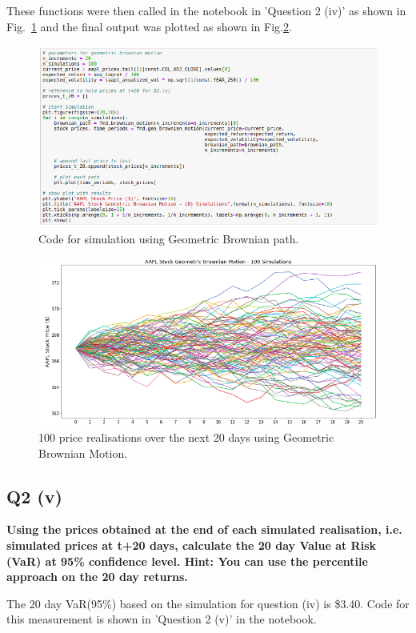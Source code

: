 \noindent
These functions were then called in the notebook in 'Question 2 (iv)' as shown in Fig.~\ref{fig:notebrown} and the final output was plotted as shown in Fig.\ref{fig:notebrownplot}.

\begin{figure}[H]
\centering
  \includegraphics[scale = .60]{imgs/simulation100.png}
  \caption{Code for simulation using Geometric Brownian path.}
  \label{fig:notebrown}
\end{figure}

\begin{figure}[H]
\centering
  \includegraphics[scale = .64]{imgs/simulationplot.png}
  \caption{100 price realisations over the next 20 days using Geometric Brownian Motion.}
  \label{fig:notebrownplot}
\end{figure}



\subsection{Q2 (v)}\label{sssec:pt2q2v}
\textbf{Using the prices obtained at the end of each simulated realisation, i.e. simulated prices at
t+20 days, calculate the 20 day Value at Risk (VaR) at 95\% confidence level. Hint: You can
use the percentile approach on the 20 day returns. }

\noindent
The 20 day VaR(95\%) based on the simulation for question (iv) is \$3.40. Code for this measurement is shown in 'Question 2 (v)' in the notebook.

